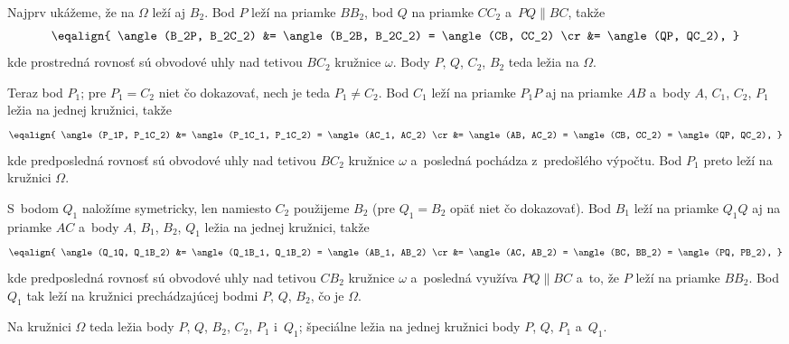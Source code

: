 {    Najprv ukážeme, že na $\Omega$ leží aj $B_2$. Bod $P$ leží na priamke $BB_2$, bod $Q$ na priamke $CC_2$ a~$PQ \parallel BC$, takže
    $$
    \eqalign{
        \angle(B_2P, B_2C_2) &= \angle(B_2B, B_2C_2) = \angle(CB, CC_2) \cr
        &= \angle(QP, QC_2),
    }
    $$
    kde prostredná rovnosť sú obvodové uhly nad tetivou $BC_2$ kružnice $\omega$. Body $P$, $Q$, $C_2$, $B_2$ teda ležia na $\Omega$.

    Teraz bod $P_1$; pre $P_1 = C_2$ niet čo dokazovať, nech je teda $P_1 \neq C_2$. Bod $C_1$ leží na priamke $P_1P$ aj na priamke $AB$ a~body $A$, $C_1$, $C_2$, $P_1$ ležia na jednej kružnici, takže
    $$
    \eqalign{
        \angle(P_1P, P_1C_2) &= \angle(P_1C_1, P_1C_2) = \angle(AC_1, AC_2) \cr
        &= \angle(AB, AC_2) = \angle(CB, CC_2) = \angle(QP, QC_2),
    }
    $$
    kde predposledná rovnosť sú obvodové uhly nad tetivou $BC_2$ kružnice $\omega$ a~posledná pochádza z~predošlého výpočtu. Bod $P_1$ preto leží na kružnici $\Omega$.

    S~bodom $Q_1$ naložíme symetricky, len namiesto $C_2$ použijeme $B_2$ (pre $Q_1 = B_2$ opäť niet čo dokazovať). Bod $B_1$ leží na priamke $Q_1Q$ aj na priamke $AC$ a~body $A$, $B_1$, $B_2$, $Q_1$ ležia na jednej kružnici, takže
    $$
    \eqalign{
        \angle(Q_1Q, Q_1B_2) &= \angle(Q_1B_1, Q_1B_2) = \angle(AB_1, AB_2) \cr
        &= \angle(AC, AB_2) = \angle(BC, BB_2) = \angle(PQ, PB_2),
    }
    $$
    kde predposledná rovnosť sú obvodové uhly nad tetivou $CB_2$ kružnice $\omega$ a~posledná využíva $PQ \parallel BC$ a~to, že $P$ leží na priamke $BB_2$. Bod $Q_1$ tak leží na kružnici prechádzajúcej bodmi $P$, $Q$, $B_2$, čo je $\Omega$.

    Na kružnici $\Omega$ teda ležia body $P$, $Q$, $B_2$, $C_2$, $P_1$ i~$Q_1$; špeciálne ležia na jednej kružnici body $P$, $Q$, $P_1$ a~$Q_1$.
}

